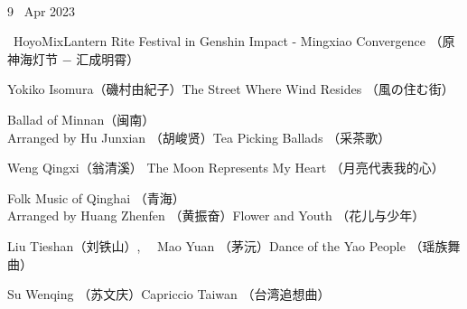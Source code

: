 \documentclass[letter,8pt,poets]{ConcProg}
\begin{document}
\begin{spacing}{1.0}
\begin{programme}{
\\  {\normalsize 9 ~Apr 2023}
}
\begin{part}[]
    \begin{composition}{\ HoyoMix}{}{Lantern Rite Festival in Genshin Impact - Mingxiao Convergence （原神海灯节 $-$ 汇成明霄）}{}      
    \end{composition} 
    
     \begin{composition}{Yokiko Isomura（磯村由紀子）}{}{The Street Where Wind Resides （風の住む街）}{}      
    \end{composition} 
    
     \begin{composition}{Ballad of Minnan（闽南）\\ Arranged by Hu Junxian （胡峻贤）}{}{Tea Picking Ballads （采茶歌）}{}      
    \end{composition} 
    
    \begin{composition}{Weng Qingxi（翁清溪） }{}{The Moon Represents My Heart （月亮代表我的心）}{}      
    \end{composition} 
    
    \begin{composition}{Folk Music of Qinghai	（青海） \\ Arranged by Huang Zhenfen （黄振奋）}{}{Flower and Youth （花儿与少年） }{}      
    \end{composition} 
    
    \begin{composition}{Liu Tieshan（刘铁山）, \ \ Mao Yuan （茅沅）}{}{Dance of the Yao People （瑶族舞曲）}{}      
    \end{composition} 
    
     \begin{composition}{Su Wenqing （苏文庆）}{}{Capriccio Taiwan （台湾追想曲）}{}      
    \end{composition} 
    
    
 
    
    
    
    
    
   
    
  
  \end{part}
  \newpage
\end{programme}

\begin{center}


\end{center}
\end{spacing}
\end{document}
